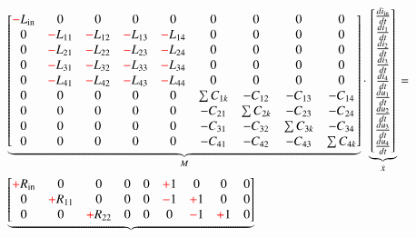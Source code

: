 \begin{refsection}
{\footnotesize 
\begin{align}
			&
			\underbrace{\begin{bmatrix}
			\color{red}-\color{black}L_\mathrm{in}&0&0&0&0 & 0&0&0&0 \\
			0&\color{red}-\color{black}L_{11}&\color{red}-\color{black}L_{12}&\color{red}-\color{black}L_{13}&\color{red}-\color{black}L_{14} & 0&0&0&0 \\
			0&\color{red}-\color{black}L_{21}&\color{red}-\color{black}L_{22}&\color{red}-\color{black}L_{23}&\color{red}-\color{black}L_{24} & 0&0&0&0 \\
			0&\color{red}-\color{black}L_{31}&\color{red}-\color{black}L_{32}&\color{red}-\color{black}L_{33}&\color{red}-\color{black}L_{34} & 0&0&0&0 \\
			0&\color{red}-\color{black}L_{41}&\color{red}-\color{black}L_{42}&\color{red}-\color{black}L_{43}&\color{red}-\color{black}L_{44} & 0&0&0&0 \\
			0&0&0&0&0 & \sum{C_{1k}}&-C_{12}&-C_{13}&-C_{14} \\
			0&0&0&0&0 & -C_{21}&\sum{C_{2k}}&-C_{23}&-C_{24} \\
			0&0&0&0&0 & -C_{31}&-C_{32}&\sum{C_{3k}}&-C_{34} \\
			0&0&0&0&0 & -C_{41}&-C_{42}&-C_{43}&\sum{C_{4k}}
			    \end{bmatrix}}_{\text{$M$}}
			\cdot
			\underbrace{\begin{bmatrix}
			\frac{di_\mathrm{in}}{dt} \\
			\frac{di_1}{dt} \\
			\frac{di_2}{dt} \\
			\frac{di_3}{dt} \\
			\frac{di_4}{dt} \\
			\frac{du_1}{dt} \\
			\frac{du_2}{dt} \\
			\frac{du_3}{dt} \\
			\frac{du_4}{dt}
			\end{bmatrix}}_{\text{$\dot{x}$}}
			= \nonumber \\
			&
			\underbrace{\begin{bmatrix}
			\color{red}+\color{black}R_\mathrm{in}&0&0&0&0 & \color{red}+\color{black}1&0&0&0 \\
			0&\color{red}+\color{black}R_{11}&0&0&0 & \color{red}-\color{black}1&\color{red}+\color{black}1&0&0 \\
			0&0&\color{red}+\color{black}R_{22}&0&0 & 0&\color{red}-\color{black}1&\color{red}+\color{black}1&0 \\

\end{bmatrix}}
\end{align}}
\end{refsection}
